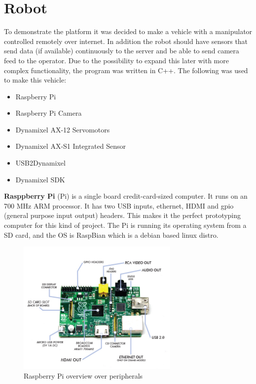 \section{Robot}
To demonstrate the platform it was decided to make a vehicle with a manipulator controlled remotely over internet. In addition the robot should have sensors that send data (if available) continuously to the server and be able to send camera feed to the operator. Due to the possibility to expand this later with more complex functionality, the program was written in C++.
The following was used to make this vehicle:
\begin{itemize}
    \item Raspberry Pi
    \item Raspberry Pi Camera
    \item Dynamixel AX-12 Servomotors
    \item Dynamixel AX-S1 Integrated Sensor
    \item USB2Dynamixel
    \item Dynamixel SDK
\end{itemize}
\vspace{\secspace}

\textbf{Rasppberry Pi} (Pi) is a single board credit-card-sized computer. It runs on an 700 MHz ARM processor.
It has two USB inputs, ethernet, HDMI and gpio (general purpose input output) headers. 
This makes it the perfect prototyping computer for this kind of project. 
The Pi is running its operating system from a SD card, and the OS is RaspBian which is a debian based linux distro.

\begin{figure}[H]
    \centering
    \includegraphics[width=0.7\textwidth]{graphics/Raspberry_Pi.png}	
    \caption{Raspberry Pi overview over peripherals}
    \label{fig:RPi}
\end{figure}

